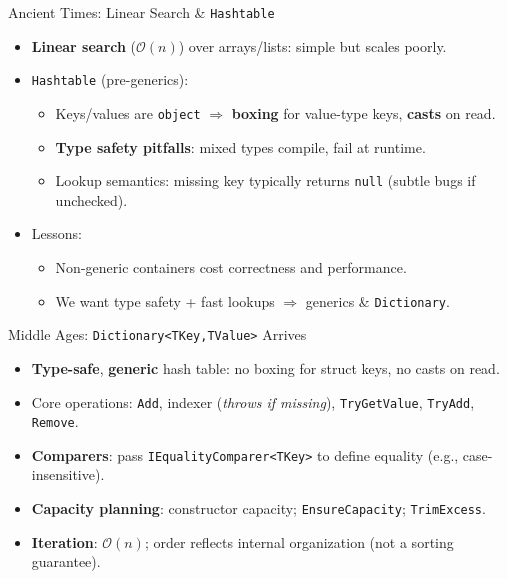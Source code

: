 \documentclass[aspectratio=169]{beamer}
\newcommand{\bigO}[1]{$\mathcal{O}(#1)$}
\newcommand{\code}[1]{\texttt{#1}}
\begin{document}
\begin{frame}{Ancient Times: Linear Search \& \code{Hashtable}}
  \begin{itemize}
    \item \textbf{Linear search} (\bigO{n}) over arrays/lists: simple but scales poorly.
    \item \code{Hashtable} (pre-generics):
      \begin{itemize}
        \item Keys/values are \code{object} $\Rightarrow$ \textbf{boxing} for value-type keys, \textbf{casts} on read.
        \item \textbf{Type safety pitfalls}: mixed types compile, fail at runtime.
        \item Lookup semantics: missing key typically returns \code{null} (subtle bugs if unchecked).
      \end{itemize}
    \item Lessons:
      \begin{itemize}
        \item Non-generic containers cost correctness and performance.
        \item We want type safety + fast lookups $\Rightarrow$ generics \& \code{Dictionary}.
      \end{itemize}
  \end{itemize}
\end{frame}

\begin{frame}{Middle Ages: \code{Dictionary<TKey,TValue>} Arrives}
  \begin{itemize}
    \item \textbf{Type-safe}, \textbf{generic} hash table: no boxing for struct keys, no casts on read.
    \item Core operations: \code{Add}, indexer (\emph{throws if missing}), \code{TryGetValue}, \code{TryAdd}, \code{Remove}.
    \item \textbf{Comparers}: pass \code{IEqualityComparer<TKey>} to define equality (e.g., case-insensitive).
    \item \textbf{Capacity planning}: constructor capacity; \code{EnsureCapacity}; \code{TrimExcess}.
    \item \textbf{Iteration}: \bigO{n}; order reflects internal organization (not a sorting guarantee).
  \end{itemize}
\end{frame}
\end{document}
